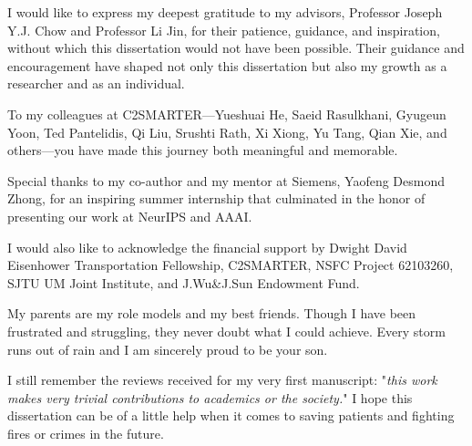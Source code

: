 
I would like to express my deepest gratitude to my advisors, Professor Joseph Y.J. Chow and Professor Li Jin, for their patience, guidance, and inspiration, without which this dissertation would not have been possible. Their guidance and encouragement have shaped not only this dissertation but also my growth as a researcher and as an individual.



To my colleagues at C2SMARTER—Yueshuai He, Saeid Rasulkhani, Gyugeun Yoon, Ted Pantelidis, Qi Liu, Srushti Rath, Xi Xiong, Yu Tang, Qian Xie, and others—you have made this journey both meaningful and memorable.

Special thanks to my co-author and my mentor at Siemens, Yaofeng Desmond Zhong, for an inspiring summer internship that culminated in the honor of presenting our work at NeurIPS and AAAI. 

I would also like to acknowledge the financial support by Dwight David Eisenhower Transportation Fellowship, C2SMARTER, NSFC Project 62103260, SJTU UM Joint Institute, and J.Wu\&J.Sun Endowment Fund.

My parents are my role models and my best friends. Though I have been frustrated and struggling, they never doubt what I could achieve. Every storm runs out of rain and I am sincerely proud to be your son.

I still remember the reviews received for my very first manuscript: "\textit{this work makes very trivial contributions to academics or the society.}" I hope this dissertation can be of a little help when it comes to saving patients and fighting fires or crimes in the future.

\noindent
{}

